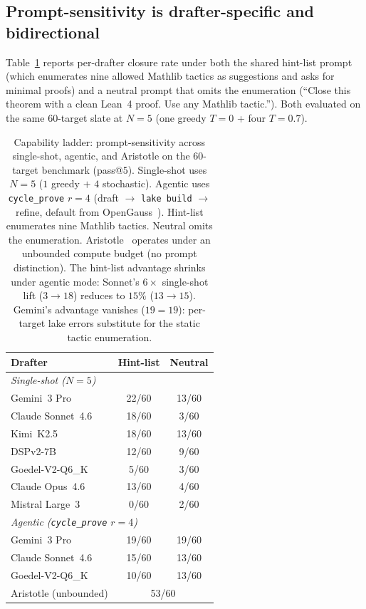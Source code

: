 \subsection{Prompt-sensitivity is drafter-specific and bidirectional}
\label{sec:spec-inversion}

Table~\ref{tab:prompt-sensitivity} reports per-drafter closure
rate under both the shared hint-list prompt (which enumerates
nine allowed Mathlib tactics as suggestions and asks for minimal
proofs) and a neutral prompt that omits the enumeration
(``Close this theorem with a clean Lean~4 proof. Use any Mathlib
tactic.''). Both evaluated on the same $60$-target
slate at $N=5$ (one greedy $T=0$ + four $T=0.7$).

\begin{table}[t]
\centering
\small
\caption{Capability ladder: prompt-sensitivity across single-shot,
agentic, and Aristotle on the $60$-target benchmark (pass@$5$). Single-shot
uses $N{=}5$ ($1$ greedy $+$ $4$ stochastic). Agentic uses
\texttt{cycle\_prove} $r{=}4$
(draft $\to$ \texttt{lake build} $\to$ refine,
default from OpenGauss~\cite{opengauss2025}).
Hint-list enumerates nine Mathlib tactics.
Neutral omits the enumeration. Aristotle~\cite{aristotle2025}
operates under an unbounded compute budget (no prompt
distinction). The hint-list advantage shrinks under agentic mode:
Sonnet's $6\times$ single-shot lift ($3 \to 18$) reduces to
$15\%$ ($13 \to 15$). Gemini's advantage vanishes ($19 = 19$):
per-target lake errors substitute for the static tactic
enumeration.}
\label{tab:prompt-sensitivity}
\begin{tabular}{lcc}
\toprule
Drafter & Hint-list & Neutral \\
\midrule
\multicolumn{3}{l}{\emph{Single-shot ($N{=}5$)}} \\
\quad Gemini~3 Pro            & 22/60 & 13/60 \\
\quad Claude Sonnet~4.6       & 18/60 &  3/60 \\
\quad Kimi~K2.5               & 18/60 & 13/60 \\
\quad DSPv2-$7$B              & 12/60 &  9/60 \\
\quad Goedel-V2-Q6\_K         &  5/60 &  3/60 \\
\quad Claude Opus~4.6         & 13/60 &  4/60 \\
\quad Mistral Large~3         &  0/60 &  2/60 \\
\midrule
\multicolumn{3}{l}{\emph{Agentic (\texttt{cycle\_prove} $r{=}4$)}} \\
\quad Gemini~3 Pro            & 19/60 & 19/60 \\
\quad Claude Sonnet~4.6       & 15/60 & 13/60 \\
\quad Goedel-V2-Q6\_K         & 10/60 & 13/60 \\
\midrule
Aristotle (unbounded)         & \multicolumn{2}{c}{53/60} \\
\bottomrule
\end{tabular}


\end{table}

